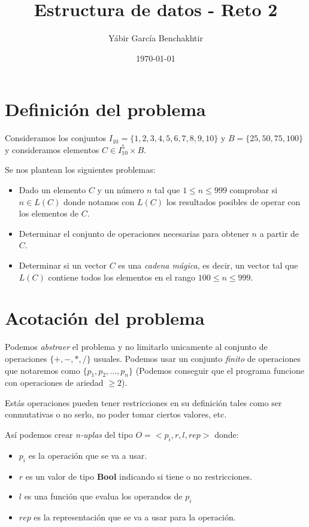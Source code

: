 \documentclass{article}
\begin{document}
\title{Estructura de datos - Reto 2}
\author{Yábir García Benchakhtir}
\date{\today}
\maketitle

\section{Definición del problema}

Consideramos los conjuntos $I_{10} = \{1,2,3,4,5,6,7,8,9,10\}$ y
$B = \{25,50,75,100\}$ y consideramos elementos
$C \in I_{10}^{5} \times B$.

Se nos plantean los siguientes problemas:

\begin{itemize}
\item Dado un elemento $C$ y un número $n$ tal que $1 \le n \le 999$
  comprobar si $n \in L(C)$ donde notamos con $L(C)$ los resultados
  posibles de operar con los elementos de $C$.

\item Determinar el conjunto de operaciones necesarias para obtener
  $n$ a partir de $C$.

\item Determinar si un vector $C$ es una \textit{cadena mágica}, es
  decir, un vector tal que $L(C)$ contiene todos los elementos en el
  rango $100 \le n \le 999$.
\end{itemize}

\section{Acotación del problema}

Podemos \textit{abstraer} el problema y no limitarlo unicamente al
conjunto de operaciones $\{+,-,*,/\}$ usuales. Podemos usar un
conjunto \textit{finito} de operaciones que notaremos como
$\{p_1, p_2, ..., p_n\}$ (Podemos conseguir que el programa funcione con operaciones
de ariedad $\ge 2 $).

Estás operaciones pueden tener restricciones en su definición tales
como ser conmutativas o no serlo, no poder tomar ciertos valores, etc.

Así podemos crear \textit{n-uplas} del tipo $O = <p_i, r, l, rep>$
donde:

\begin{itemize}
\item $p_i$ es la operación que se va a usar.
\item $r$ es un valor de tipo \textbf{Bool} indicando si tiene o no
  restricciones.
\item $l$ es una función que evalua los operandos de $p_i$
\item $rep$ es la representación que se va a usar para la operación. 
\end{itemize}
\end{document}
